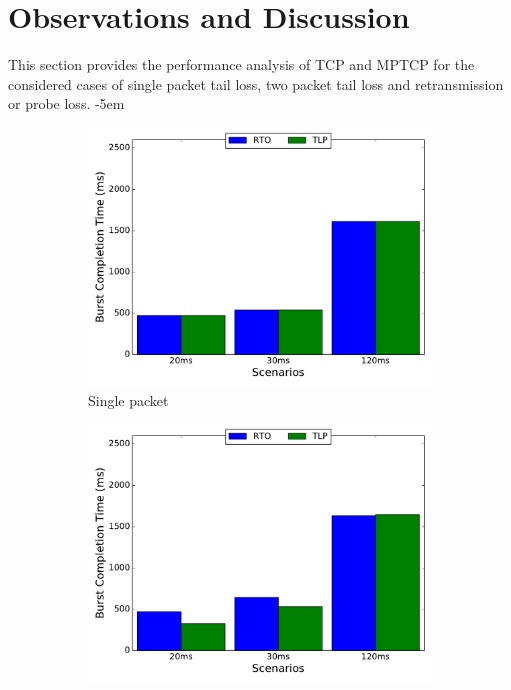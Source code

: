 \documentclass[10pt,conference,compsoc]{IEEEtran}
\begin{document}
\section{Observations and Discussion}\label{disc}
This section provides the performance analysis of TCP and MPTCP for the considered cases of single packet tail loss, two packet tail loss and retransmission or probe loss.
\kern-5em
\begin{figure}[!tbp]
 \begin{subfigure}[b]{0.32\textwidth}
	\includegraphics[angle=0, width=\textwidth,natwidth=578.16,natheight=433.62]{plots/T1P.pdf}
	\caption{Single packet}\label{t1p}
 \end{subfigure}
 \hfill
 \begin{subfigure}[b]{0.32\textwidth}
	\includegraphics[angle=0, width=\textwidth,natwidth=578.16,natheight=433.62]{plots/T2P.pdf}

\end{subfigure}
\end{figure}
\end{document}
